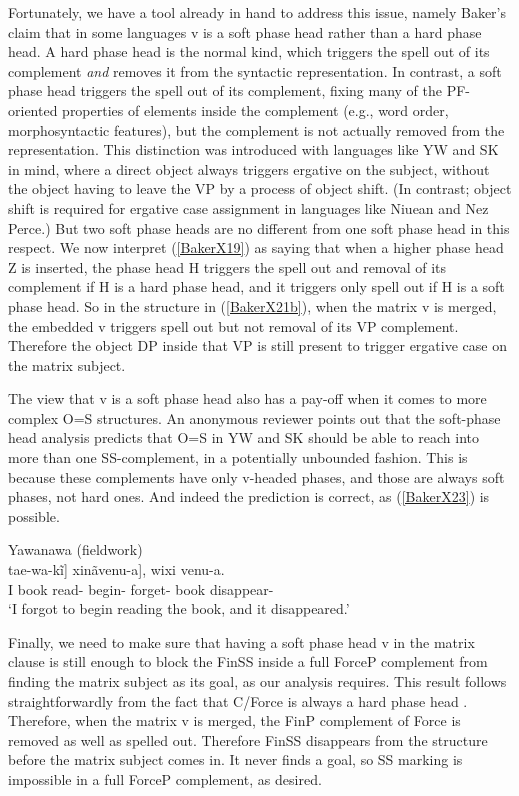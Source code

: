 \documentclass[output=paper]{langscibook}
\begin{document}
Fortunately, we have a tool already in hand to address this issue, namely Baker’s \citeyearpar{baker2015case} claim that in some languages v is a soft phase head rather than a hard phase head. A hard phase head is the normal kind, which triggers the spell out of its complement \textit{and} removes it from the syntactic representation. In contrast, a soft phase head triggers the spell out of its complement, fixing many of the PF-oriented properties of elements inside the complement (e.g., word order, morphosyntactic features), but the complement is not actually removed from the representation. This distinction was introduced with languages like YW and SK in mind, where a direct object always triggers ergative on the subject, without the object having to leave the VP by a process of object shift. (In contrast; object shift is required for ergative case assignment in languages like Niuean and Nez Perce.) But two soft phase heads are no different from one soft phase head in this respect. We now interpret (\ref{BakerX19}) as saying that when a higher phase head Z is inserted, the phase head H triggers the spell out and removal of its complement if H is a hard phase head, and it triggers only spell out if H is a soft phase head. So in the structure in (\ref{BakerX21b}), when the matrix v is merged, the embedded v triggers spell out but not removal of its VP complement. Therefore the object DP inside that VP is still present to trigger ergative case on the matrix subject.

The view that v is a soft phase head also has a pay-off when it comes to more complex O=S structures. An anonymous reviewer points out that the soft-phase head analysis predicts that O=S in YW and SK should be able to reach into more than one SS-complement, in a potentially unbounded fashion. This is because these complements have only v-headed phases, and those are always soft phases, not hard ones. And indeed the prediction is correct, as (\ref{BakerX23}) is possible.

\begin{exe}
    \ex Yawanawa (fieldwork) \label{BakerX23}\\
			\gll [Ẽ [[wixi ane-kĩ] tae-wa-kĩ] xinãvenu-a], wixi venu-a.\\
			    I book read-\sc{ss} begin- forget- book disappear-\\
			\glt `I forgot to begin reading the book, and it disappeared.'
\end{exe}

Finally, we need to make sure that having a soft phase head v in the matrix clause is still enough to block the FinSS inside a full ForceP complement from finding the matrix subject as its goal, as our analysis requires. This result follows straightforwardly from the fact that C/Force is always a hard phase head \citep[149]{baker2015case}. Therefore, when the matrix v is merged, the FinP complement of Force is removed as well as spelled out. Therefore FinSS disappears from the structure before the matrix subject comes in. It never finds a goal, so SS marking is impossible in a full ForceP complement, as desired.
\end{document}
